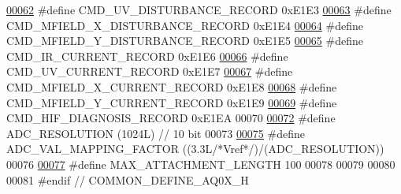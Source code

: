 \begin{DoxyCode}
\hypertarget{a00031_source_l00062}{}\hyperlink{a00031_ae45bb46748497c6a117beb1e93072d83}{00062} \textcolor{preprocessor}{#define CMD\_UV\_DISTURBANCE\_RECORD                               0xE1E3}
\hypertarget{a00031_source_l00063}{}\hyperlink{a00031_ab84aea346a3f75b58f8bda67b8ae9be0}{00063} \textcolor{preprocessor}{#define CMD\_MFIELD\_X\_DISTURBANCE\_RECORD                         0xE1E4}
\hypertarget{a00031_source_l00064}{}\hyperlink{a00031_af77e9c0ad32b3cc50d61992d4b64a831}{00064} \textcolor{preprocessor}{#define CMD\_MFIELD\_Y\_DISTURBANCE\_RECORD                         0xE1E5}
\hypertarget{a00031_source_l00065}{}\hyperlink{a00031_a4dcce4fd3ff29eb6782f3228901f99cf}{00065} \textcolor{preprocessor}{#define CMD\_IR\_CURRENT\_RECORD                                   0xE1E6}
\hypertarget{a00031_source_l00066}{}\hyperlink{a00031_ab0e0364ddc2d95d1e5b51a3e3ff50918}{00066} \textcolor{preprocessor}{#define CMD\_UV\_CURRENT\_RECORD                                   0xE1E7}
\hypertarget{a00031_source_l00067}{}\hyperlink{a00031_ab796345ffdbc6a240b67b56583bb77c6}{00067} \textcolor{preprocessor}{#define CMD\_MFIELD\_X\_CURRENT\_RECORD                             0xE1E8}
\hypertarget{a00031_source_l00068}{}\hyperlink{a00031_a8ddac7f7a2a90f2d8535af02e338b1bf}{00068} \textcolor{preprocessor}{#define CMD\_MFIELD\_Y\_CURRENT\_RECORD                             0xE1E9}
\hypertarget{a00031_source_l00069}{}\hyperlink{a00031_a185ed5442d69c7c8abba13323a8e8187}{00069} \textcolor{preprocessor}{#define CMD\_HIF\_DIAGNOSIS\_RECORD                                0xE1EA}
00070 
\hypertarget{a00031_source_l00072}{}\hyperlink{a00031_a00978ca9e8220475258dcbbbb7d29129}{00072} \textcolor{preprocessor}{#define ADC\_RESOLUTION                                          (1024L) // 10 bit}
00073 
\hypertarget{a00031_source_l00075}{}\hyperlink{a00031_ada92d3eeeec0cbeee41e76a52d145792}{00075} \textcolor{preprocessor}{#define ADC\_VAL\_MAPPING\_FACTOR                                  ((3.3L}\textcolor{comment}{/*Vref*/}\textcolor{preprocessor}{)/(ADC\_RESOLUTION))}
00076 
\hypertarget{a00031_source_l00077}{}\hyperlink{a00031_aa8abe3a822c64813f7aaba3ca7e3db9c}{00077} \textcolor{preprocessor}{#define MAX\_ATTACHMENT\_LENGTH                                   100}
00078 
00079 
00080 
00081 \textcolor{preprocessor}{#endif // COMMON\_DEFINE\_AQ0X\_H}
\end{DoxyCode}
